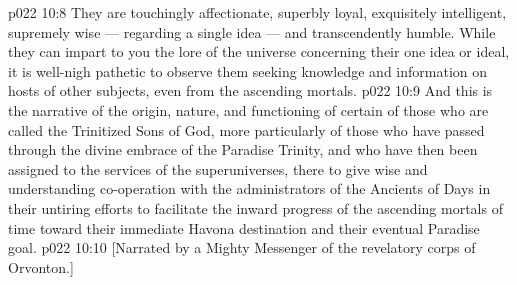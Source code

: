\vs p022 10:8 They are touchingly affectionate, superbly loyal, exquisitely intelligent, supremely wise --- regarding a single idea --- and transcendently humble. While they can impart to you the lore of the universe concerning their one idea or ideal, it is well\hyp{}nigh pathetic to observe them seeking knowledge and information on hosts of other subjects, even from the ascending mortals.
\vs p022 10:9 \pc And this is the narrative of the origin, nature, and functioning of certain of those who are called the Trinitized Sons of God, more particularly of those who have passed through the divine embrace of the Paradise Trinity, and who have then been assigned to the services of the superuniverses, there to give wise and understanding co\hyp{}operation with the administrators of the Ancients of Days in their untiring efforts to facilitate the inward progress of the ascending mortals of time toward their immediate Havona destination and their eventual Paradise goal.
\vsetoff
\vs p022 10:10 [Narrated by a Mighty Messenger of the revelatory corps of Orvonton.]
\quizlink
